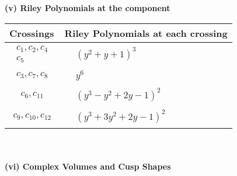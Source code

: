 \documentclass[1p]{elsarticle_modified}
\theoremstyle{definition}
\begin{document}
\newpage\renewcommand{\arraystretch}{1}
\flushleft \textbf{(v) Riley Polynomials at the component}\newline \\
\begin{tabular}{m{50pt}|m{274pt}}
Crossings & \hspace{64pt}Riley Polynomials at each crossing \\
\hline $$\begin{aligned}c_{1},c_{2},c_{4}\\c_{5}\end{aligned}$$&$\begin{aligned}
&(y^2+y+1)^3
\end{aligned}$\\
\hline $$\begin{aligned}c_{3},c_{7},c_{8}\end{aligned}$$&$\begin{aligned}
&y^6
\end{aligned}$\\
\hline $$\begin{aligned}c_{6},c_{11}\end{aligned}$$&$\begin{aligned}
&(y^3- y^2+2 y-1)^2
\end{aligned}$\\
\hline $$\begin{aligned}c_{9},c_{10},c_{12}\end{aligned}$$&$\begin{aligned}
&(y^3+3 y^2+2 y-1)^2
\end{aligned}$\\
\hline
\end{tabular}\\~\\
\newpage\flushleft \textbf{(vi) Complex Volumes and Cusp Shapes}
\end{document}
